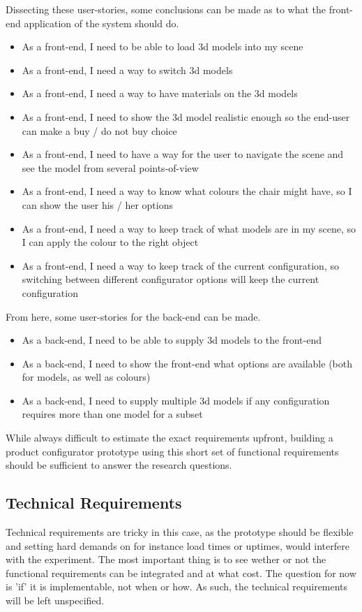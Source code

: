 Dissecting these user-stories, some conclusions can be made as to what the front-end application of the system should do.
\begin{itemize}
	\item As a front-end, I need to be able to load 3d models into my scene
	\item As a front-end, I need a way to switch 3d models
	\item As a front-end, I need a way to have materials on the 3d models
	\item As a front-end, I need to show the 3d model realistic enough so the end-user can make a buy / do not buy choice
	\item As a front-end, I need to have a way for the user to navigate the scene and see the model from several points-of-view
	\item As a front-end, I need a way to know what colours the chair might have, so I can show the user his / her options
	\item As a front-end, I need a way to keep track of what models are in my scene, so I can apply the colour to the right object
	\item As a front-end, I need a way to keep track of the current configuration, so switching between different configurator options will keep the current configuration
\end{itemize}

From here, some user-stories for the back-end can be made.
\begin{itemize}
	\item As a back-end, I need to be able to supply 3d models to the front-end
	\item As a back-end, I need to show the front-end what options are available (both for models, as well as colours)
	\item As a back-end, I need to supply multiple 3d models if any configuration requires more than one model for a subset
\end{itemize}

While always difficult to estimate the exact requirements upfront, building a product configurator prototype using this short set of functional requirements should be sufficient to answer the research questions. 

\subsection{Technical Requirements}
Technical requirements are tricky in this case, as the prototype should be flexible and setting hard demands on for instance load times or uptimes, would interfere with the experiment. The most important thing is to see wether or not the functional requirements can be integrated and at what cost. The question for now is 'if' it is implementable, not when or how. As such, the technical requirements will be left unspecified.

